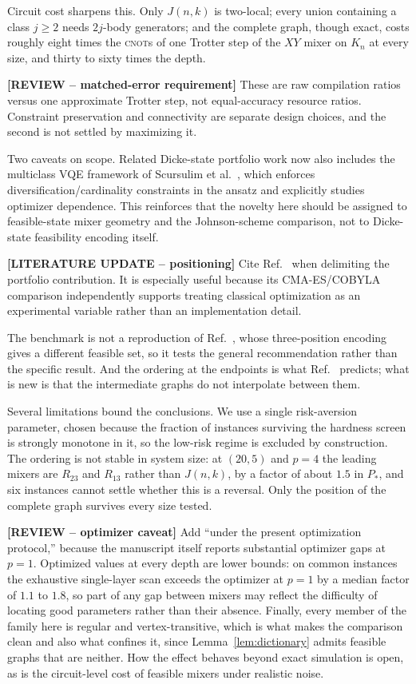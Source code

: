 Circuit cost sharpens this. Only $J(n,k)$ is two-local; every union containing a class $j\ge2$ needs $2j$-body generators; and the complete graph, though exact, costs roughly eight times the \textsc{cnot}s of one Trotter step of the $XY$ mixer on $K_n$ at every size, and thirty to sixty times the depth.

{\color{red}\textbf{[REVIEW -- matched-error requirement]} These are raw compilation ratios versus one approximate Trotter step, not equal-accuracy resource ratios.} Constraint preservation and connectivity are separate design choices, and the second is not settled by maximizing it.

Two caveats on scope. Related Dicke-state portfolio work now also includes the multiclass VQE framework of Scursulim et al.~\cite{Scursulim2026}, which enforces diversification/cardinality constraints in the ansatz and explicitly studies optimizer dependence. This reinforces that the novelty here should be assigned to feasible-state mixer geometry and the Johnson-scheme comparison, not to Dicke-state feasibility encoding itself.

{\color{red}\textbf{[LITERATURE UPDATE -- positioning]} Cite Ref.~\cite{Scursulim2026} when delimiting the portfolio contribution. It is especially useful because its CMA-ES/COBYLA comparison independently supports treating classical optimization as an experimental variable rather than an implementation detail.}

The benchmark is not a reproduction of Ref.~\cite{Slate2021}, whose three-position encoding gives a different feasible set, so it tests the general recommendation rather than the specific result. And the ordering at the endpoints is what Ref.~\cite{Bridi2024} predicts; what is new is that the intermediate graphs do not interpolate between them.

Several limitations bound the conclusions. We use a single risk-aversion parameter, chosen because the fraction of instances surviving the hardness screen is strongly monotone in it, so the low-risk regime is excluded by construction. The ordering is not stable in system size: at $(20,5)$ and $p=4$ the leading mixers are $R_{23}$ and $R_{13}$ rather than $J(n,k)$, by a factor of about $1.5$ in $P_*$, and six instances cannot settle whether this is a reversal. Only the position of the complete graph survives every size tested.

{\color{red}\textbf{[REVIEW -- optimizer caveat]} Add ``under the present optimization protocol,'' because the manuscript itself reports substantial optimizer gaps at $p=1$.} Optimized values at every depth are lower bounds: on common instances the exhaustive single-layer scan exceeds the optimizer at $p=1$ by a median factor of $1.1$ to $1.8$, so part of any gap between mixers may reflect the difficulty of locating good parameters rather than their absence. Finally, every member of the family here is regular and vertex-transitive, which is what makes the comparison clean and also what confines it, since Lemma~\ref{lem:dictionary} admits feasible graphs that are neither. How the effect behaves beyond exact simulation is open, as is the circuit-level cost of feasible mixers under realistic noise.

